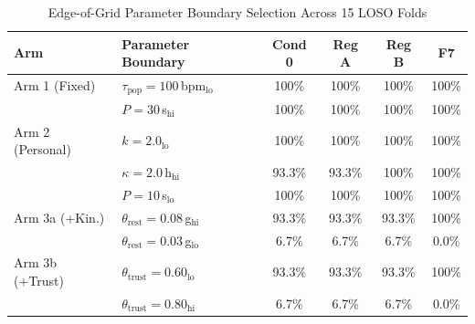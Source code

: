 \begin{table}[htbp]
\caption{Edge-of-Grid Parameter Boundary Selection Across 15 LOSO Folds}
\label{tab:edge_of_grid}
\centering
\scriptsize
\setlength{\tabcolsep}{3pt}
\begin{tabular}{|l|l|c|c|c|c|}
\hline
\textbf{Arm} & \textbf{Parameter Boundary} & \textbf{Cond 0} & \textbf{Reg A} & \textbf{Reg B} & \textbf{F7} \\
\hline
Arm 1 (Fixed)    & $\tau_{\text{pop}} = 100$\,bpm$_{\mathrm{lo}}$ & 100\% & 100\% & 100\% & 100\% \\
                 & $P = 30$\,s$_{\mathrm{hi}}$                     & 100\% & 100\% & 100\% & 100\% \\
\hline
Arm 2 (Personal) & $k = 2.0_{\mathrm{lo}}$                         & 100\% & 100\% & 100\% & 100\% \\
                 & $\kappa = 2.0$\,h$_{\mathrm{hi}}$               & 93.3\% & 93.3\% & 100\% & 100\% \\
                 & $P = 10$\,s$_{\mathrm{lo}}$                     & 100\% & 100\% & 100\% & 100\% \\
\hline
Arm 3a (+Kin.)   & $\theta_{\text{rest}} = 0.08$\,g$_{\mathrm{hi}}$ & 93.3\% & 93.3\% & 93.3\% & 100\% \\
                 & $\theta_{\text{rest}} = 0.03$\,g$_{\mathrm{lo}}$ & 6.7\%  & 6.7\%  & 6.7\%  & 0.0\% \\
\hline
Arm 3b (+Trust)  & $\theta_{\text{trust}} = 0.60_{\mathrm{lo}}$     & 93.3\% & 93.3\% & 93.3\% & 100\% \\
                 & $\theta_{\text{trust}} = 0.80_{\mathrm{hi}}$     & 6.7\%  & 6.7\%  & 6.7\%  & 0.0\% \\
\hline
\end{tabular}
\end{table}
